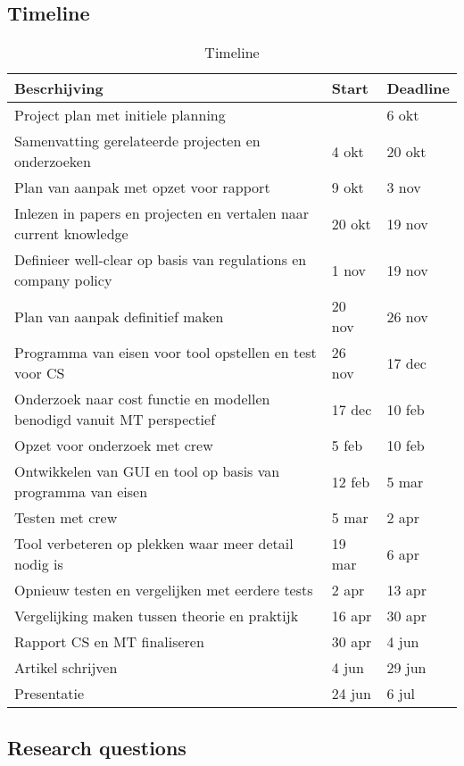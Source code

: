 \subsection{Timeline}
\begin{table}[h]
	\centering
	\caption{Timeline}
	\label{tab:timeline-project}
	\begin{tabular}{l||l|l}
		Bescrhijving & Start & Deadline \\ \hline \hline
		Project plan met initiele planning &  & 6 okt \\ \hline
		Samenvatting gerelateerde projecten en onderzoeken & 4 okt & 20 okt \\ \hline
		Plan van aanpak met opzet voor rapport & 9 okt & 3 nov \\ \hline
		Inlezen in papers en projecten en vertalen naar current knowledge & 20 okt & 19 nov \\ \hline
		Definieer well-clear op basis van regulations en company policy & 1 nov & 19 nov \\ \hline
		Plan van aanpak definitief maken & 20 nov & 26 nov \\ \hline
		Programma van eisen voor tool opstellen en test voor CS & 26 nov & 17 dec \\ \hline
		Onderzoek naar cost functie en modellen benodigd vanuit MT perspectief & 17 dec & 10 feb \\ \hline
		Opzet voor onderzoek met crew & 5 feb & 10 feb \\ \hline
		Ontwikkelen van GUI en tool op basis van programma van eisen & 12 feb & 5 mar \\ \hline
		Testen met crew & 5 mar & 2 apr \\ \hline
		Tool verbeteren op plekken waar meer detail nodig is & 19 mar & 6 apr \\ \hline
		Opnieuw testen en vergelijken met eerdere tests & 2 apr & 13 apr \\ \hline
		Vergelijking maken tussen theorie en praktijk & 16 apr & 30 apr \\ \hline
		Rapport CS en MT finaliseren & 30 apr & 4 jun \\ \hline
		Artikel schrijven & 4 jun & 29 jun \\ \hline
		Presentatie & 24 jun & 6 jul
	\end{tabular}
\end{table}

\subsection{Research questions}